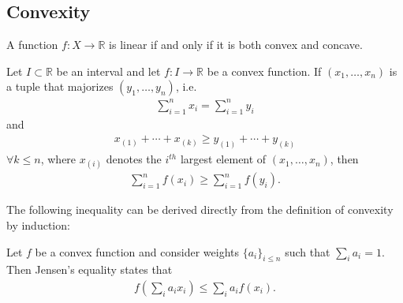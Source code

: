 \subsection{Convexity}


    \begin{property}
        A function $f:X\rightarrow\mathbb{R}$ is linear if and only if it is both convex and concave.
    \end{property}

    \begin{theorem}
        Let $I\subset\mathbb{R}$ be an interval and let $f:I\rightarrow\mathbb{R}$ be a convex function. If $(x_1, \ldots, x_n)$ is a tuple that majorizes $(y_1, \ldots, y_n)$, i.e.
        \begin{gather}
            \sum_{i=1}^nx_i = \sum_{i=1}^ny_i
        \end{gather}
        and
        \begin{gather}
            x_{(1)} + \cdots + x_{(k)}\geq y_{(1)} + \cdots + y_{(k)}
        \end{gather}
        $\forall k\leq n$, where $x_{(i)}$ denotes the $i^{th}$ largest element of $(x_1,\ldots,x_n)$, then
        \begin{gather}
            \sum_{i=1}^nf(x_i)\geq \sum_{i=1}^nf(y_i).
        \end{gather}
    \end{theorem}
    The following inequality can be derived directly from the definition of convexity by induction:
    \begin{theorem}
        Let $f$ be a convex function and consider weights $\{a_i\}_{i\leq n}$ such that $\sum_ia_i=1$. Then Jensen's equality states that
        \begin{gather}
            \label{linalgebra:jensen_inequality}
            f\left(\sum_ia_ix_i\right) \leq \sum_ia_if(x_i).
        \end{gather}
    \end{theorem}